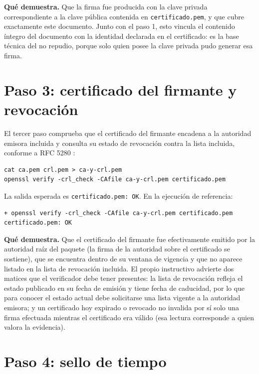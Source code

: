 \textbf{Qué demuestra.} Que la firma fue producida con la clave privada correspondiente a la clave pública contenida en \texttt{certificado.pem}, y que cubre exactamente este documento. Junto con el paso 1, esto vincula el contenido íntegro del documento con la identidad declarada en el certificado: es la base técnica del no repudio, porque solo quien posee la clave privada pudo generar esa firma.

\section{Paso 3: certificado del firmante y revocación}\label{sec:verificacion-certificado}

El tercer paso comprueba que el certificado del firmante encadena a la autoridad emisora incluida y consulta su estado de revocación contra la lista incluida, conforme a RFC 5280 \cite{cooper2008}:

\begin{lstlisting}[numbers=none]
cat ca.pem crl.pem > ca-y-crl.pem
openssl verify -crl_check -CAfile ca-y-crl.pem certificado.pem
\end{lstlisting}

La salida esperada es \texttt{certificado.pem: OK}. En la ejecución de referencia:

\begin{lstlisting}[numbers=none]
+ openssl verify -crl_check -CAfile ca-y-crl.pem certificado.pem
certificado.pem: OK
\end{lstlisting}

\textbf{Qué demuestra.} Que el certificado del firmante fue efectivamente emitido por la autoridad raíz del paquete (la firma de la autoridad sobre el certificado se sostiene), que se encuentra dentro de su ventana de vigencia y que no aparece listado en la lista de revocación incluida. El propio instructivo advierte dos matices que el verificador debe tener presentes: la lista de revocación refleja el estado publicado en su fecha de emisión y tiene fecha de caducidad, por lo que para conocer el estado actual debe solicitarse una lista vigente a la autoridad emisora; y un certificado hoy expirado o revocado no invalida por sí solo una firma efectuada mientras el certificado era válido (esa lectura corresponde a quien valora la evidencia).

\section{Paso 4: sello de tiempo}\label{sec:verificacion-sello}

